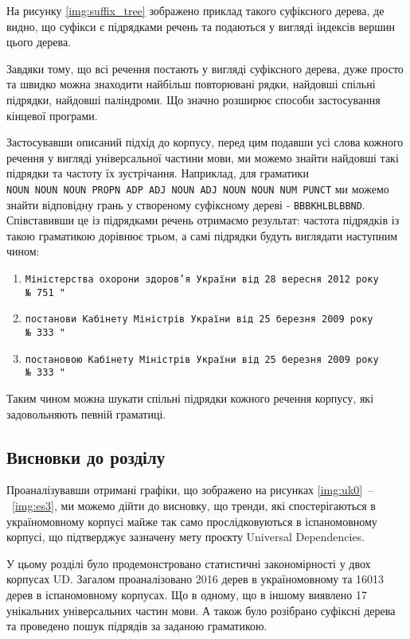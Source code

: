 На рисунку \ref{img:suffix_tree} зображено приклад такого суфіксного дерева,
де видно, що суфікси є підрядками речень та подаються у вигляді індексів
вершин цього дерева.

Завдяки тому, що всі речення постають у вигляді суфіксного дерева, дуже просто
та швидко можна знаходити найбільш повторювані рядки, найдовші спільні
підрядки, найдовші паліндроми. Що значно розширює способи застосування
кінцевої програми.

Застосувавши описаний підхід до корпусу, перед цим подавши усі слова кожного
речення у вигляді універсальної частини мови, ми можемо знайти найдовші такі
підрядки та частоту їх зустрічання. Наприклад, для граматики
\texttt{NOUN~NOUN~NOUN~PROPN~ADP~ADJ~NOUN~ADJ~NOUN~NOUN~NUM~PUNCT} ми можемо
знайти відповідну грань у створеному суфіксному дереві - \texttt{BBBKHLBLBBND}.
Співставивши це із підрядками речень отримаємо результат: частота підрядків
із такою граматикою дорівнює трьом, а самі підрядки будуть виглядати наступним
чином: 
\begin{enumerate}
    \item \texttt{Міністерства охорони здоров’я України від 28 вересня 2012 року
    №~751~"}
    \item \texttt{постанови Кабінету Міністрів України від 25 березня 2009 року
    №~333~"}
    \item \texttt{постановою Кабінету Міністрів України від 25 березня 2009 року 
    №~333~"}
\end{enumerate}

Таким чином можна шукати спільні підрядки кожного речення корпусу, які
задовольняють певній граматиці. 


\subsection*{Висновки до розділу }
Проаналізувавши отримані графіки, що зображено на рисунках
\ref{img:uk0}~\nobreakdash--~\ref{img:es3},
ми можемо дійти до висновку, що тренди, які
спостерігаються в україномовному корпусі майже так само прослідковуються в
іспаномовному корпусі, що підтверджує зазначену мету проєкту Universal Dependencies.

У цьому розділі було продемонстровано статистичні закономірності у двох
корпусах UD. Загалом проаналізовано 2016 дерев в україномовному та 16013 дерев
в іспаномовному корпусах. Що в одному, що в іншому виявлено 17 унікальних
універсальних частин мови. А також було розібрано суфіксні дерева та проведено
пошук підрядів за заданою граматикою.

